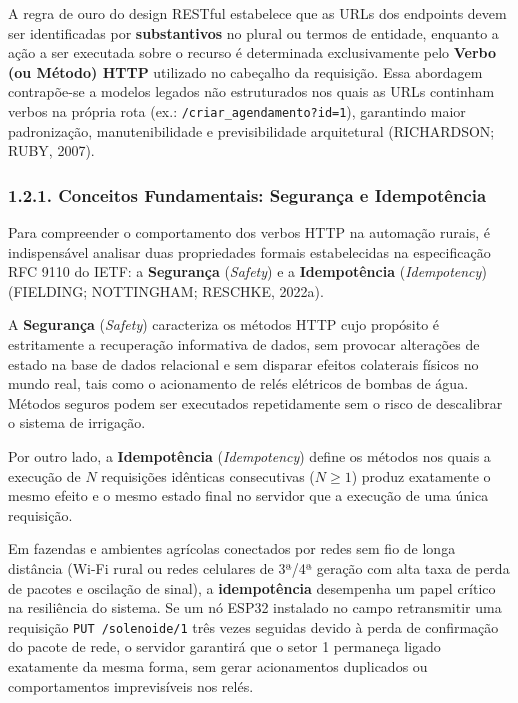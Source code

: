 A regra de ouro do design RESTful estabelece que as URLs dos endpoints devem ser identificadas por \textbf{substantivos} no plural ou termos de entidade, enquanto a ação a ser executada sobre o recurso é determinada exclusivamente pelo \textbf{Verbo (ou Método) HTTP} utilizado no cabeçalho da requisição. Essa abordagem contrapõe-se a modelos legados não estruturados nos quais as URLs continham verbos na própria rota (ex.: \texttt{/criar\_agendamento?id=1}), garantindo maior padronização, manutenibilidade e previsibilidade arquitetural (RICHARDSON; RUBY, 2007).

\subsubsection*{1.2.1. Conceitos Fundamentais: Segurança e Idempotência}

Para compreender o comportamento dos verbos HTTP na automação rurais, é indispensável analisar duas propriedades formais estabelecidas na especificação RFC 9110 do IETF: a \textbf{Segurança} (\textit{Safety}) e a \textbf{Idempotência} (\textit{Idempotency}) (FIELDING; NOTTINGHAM; RESCHKE, 2022a).

A \textbf{Segurança} (\textit{Safety}) caracteriza os métodos HTTP cujo propósito é estritamente a recuperação informativa de dados, sem provocar alterações de estado na base de dados relacional e sem disparar efeitos colaterais físicos no mundo real, tais como o acionamento de relés elétricos de bombas de água. Métodos seguros podem ser executados repetidamente sem o risco de descalibrar o sistema de irrigação.

Por outro lado, a \textbf{Idempotência} (\textit{Idempotency}) define os métodos nos quais a execução de $N$ requisições idênticas consecutivas ($N \ge 1$) produz exatamente o mesmo efeito e o mesmo estado final no servidor que a execução de uma única requisição. 

Em fazendas e ambientes agrícolas conectados por redes sem fio de longa distância (Wi-Fi rural ou redes celulares de 3ª/4ª geração com alta taxa de perda de pacotes e oscilação de sinal), a \textbf{idempotência} desempenha um papel crítico na resiliência do sistema. Se um nó ESP32 instalado no campo retransmitir uma requisição \texttt{PUT /solenoide/1} três vezes seguidas devido à perda de confirmação do pacote de rede, o servidor garantirá que o setor 1 permaneça ligado exatamente da mesma forma, sem gerar acionamentos duplicados ou comportamentos imprevisíveis nos relés.

